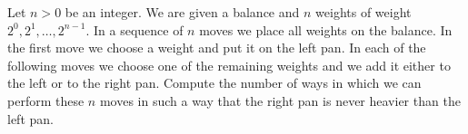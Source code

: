 Let $n > 0$ be an integer. We are given a balance and $n$ weights of weight $2^{0}, 2^{1}, \ldots, 2^{n-1}$. In a sequence of $n$ moves we place all weights on the balance. In the first move we choose a weight and put it on the left pan. In each of the following moves we choose one of the remaining weights and we add it either to the left or to the right pan. Compute the number of ways in which we can perform these $n$ moves in such a way that the right pan is never heavier than the left pan.
